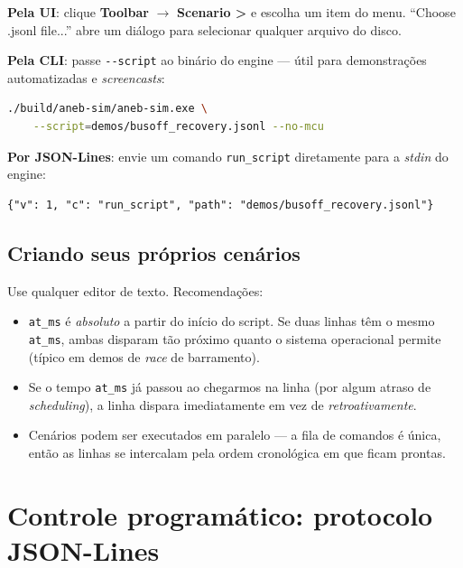 \documentclass[12pt,a4paper]{article}
\begin{document}
\textbf{Pela UI}: clique \textbf{Toolbar} $\to$ \textbf{Scenario \textbf{\textgreater{}}} e escolha
um item do menu. ``Choose .jsonl file...'' abre um diálogo para
selecionar qualquer arquivo do disco.

\textbf{Pela CLI}: passe \texttt{-{}-script} ao binário do engine ---
útil para demonstrações automatizadas e \emph{screencasts}:

\begin{lstlisting}[language=bash]
./build/aneb-sim/aneb-sim.exe \
    --script=demos/busoff_recovery.jsonl --no-mcu
\end{lstlisting}

\textbf{Por JSON-Lines}: envie um comando \texttt{run\_script}
diretamente para a \emph{stdin} do engine:

\begin{lstlisting}
{"v": 1, "c": "run_script", "path": "demos/busoff_recovery.jsonl"}
\end{lstlisting}

\subsection{Criando seus próprios cenários}

Use qualquer editor de texto. Recomendações:

\begin{itemize}[nosep]
  \item \texttt{at\_ms} é \emph{absoluto} a partir do início do
        script. Se duas linhas têm o mesmo \texttt{at\_ms}, ambas
        disparam tão próximo quanto o sistema operacional permite
        (típico em demos de \emph{race} de barramento).
  \item Se o tempo \texttt{at\_ms} já passou ao chegarmos na linha
        (por algum atraso de \emph{scheduling}), a linha dispara
        imediatamente em vez de \emph{retroativamente}.
  \item Cenários podem ser executados em paralelo --- a fila de
        comandos é única, então as linhas se intercalam pela ordem
        cronológica em que ficam prontas.
\end{itemize}

\section{Controle programático: protocolo JSON-Lines}
\end{document}
